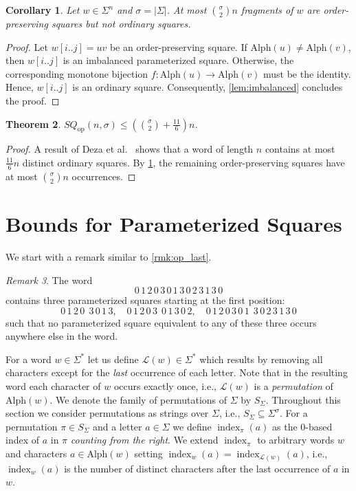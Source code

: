 \documentclass{article}
\theoremstyle{plain}
\newtheorem{theorem}{Theorem}[section]
\newtheorem{corollary}[theorem]{Corollary}
\theoremstyle{definition}
\theoremstyle{remark}
\newtheorem{remark}[theorem]{Remark}
\newcommand{\SQ}{\mathit{SQ}}
\renewcommand{\Alph}{\mathrm{Alph}}
\newcommand{\SQOP}{\SQ_{\mathrm{op}}}
\renewcommand{\L}{\mathcal{L}}
\DeclareMathOperator{\ind}{index}
\begin{document}
  \begin{corollary}\label{cor:op}
  Let $w\in \Sigma^n$ and $\sigma=|\Sigma|$. At most $\binom{\sigma}{2} n$ fragments of $w$
  are order-preserving squares but not ordinary squares.
  \end{corollary}
  \begin{proof}
  Let $w[i..j]=uv$ be an order-preserving square. If $\Alph(u)\ne \Alph(v)$, then $w[i..j]$ is an imbalanced
  parameterized square. Otherwise, the corresponding monotone bijection $f: \Alph(u)\to \Alph(v)$ must be the identity.
  Hence, $w[i..j]$ is an ordinary square. Consequently, \cref{lem:imbalanced} concludes the proof.
  \end{proof}
  
  \begin{theorem}\label{thm:op}
  $\SQOP(n,\sigma)\le (\binom{\sigma}{2}+\frac{11}{6})n$.
  \end{theorem}
  \begin{proof}
  A result of Deza et al.~\cite{DBLP:journals/dam/DezaFT15} shows that a word of length $n$ contains
  at most $\frac{11}{6}n$ distinct ordinary squares.
  By \cref{cor:op}, the remaining order-preserving squares have at most $\binom{\sigma}{2} n$ occurrences.
  \end{proof}

  
  \section{Bounds for Parameterized Squares}\label{sec:param}
  We start with a remark similar to \cref{rmk:op_last}.

  \begin{remark}
   The word
    \[0\, 1\, 2\, 0\, 3\, 0\, 1\, 3\, 0\, 2\, 3\, 1\, 3\, 0\]
    contains three parameterized squares starting at the first position:
    \[0\, 1\, 2\, 0\ \ 3\, 0\, 1\, 3,\quad 0\, 1\, 2\, 0\, 3\ \ 0\, 1\, 3\, 0\, 2,\quad 0\, 1\, 2\, 0\, 3\, 0\, 1\ \ 3\, 0\, 2\, 3\, 1\, 3\, 0\]
    such that no parameterized square equivalent to any of these three occurs anywhere else in the word.
  \end{remark}
  
  For a word $w\in \Sigma^*$ let us define $\L(w)\in \Sigma^*$ which results by removing all characters
  except for the \emph{last} occurrence of each letter. Note that in the resulting word
  each character of $w$ occurs exactly once, i.e., $\L(w)$ is a \emph{permutation} of $\Alph(w)$.
  We denote the family of permutations of $\Sigma$ by $S_{\Sigma}$.
  Throughout this section we consider permutations as strings over $\Sigma$, i.e., $S_{\Sigma}\subseteq \Sigma^\sigma$.
  For a permutation $\pi \in S_\Sigma$ and a letter $a\in \Sigma$ we define $\ind_{\pi}(a)$ as the 0-based index of $a$ in $\pi$
  \emph{counting from the right}. We extend $\ind_{\pi}$ to arbitrary words $w$ and characters $a\in \Alph(w)$ setting $\ind_{w}(a)=\ind_{\L(w)}(a)$,
  i.e., $\ind_{w}(a)$ is the number of distinct characters after the last occurrence of $a$ in $w$.
  
\end{document}
